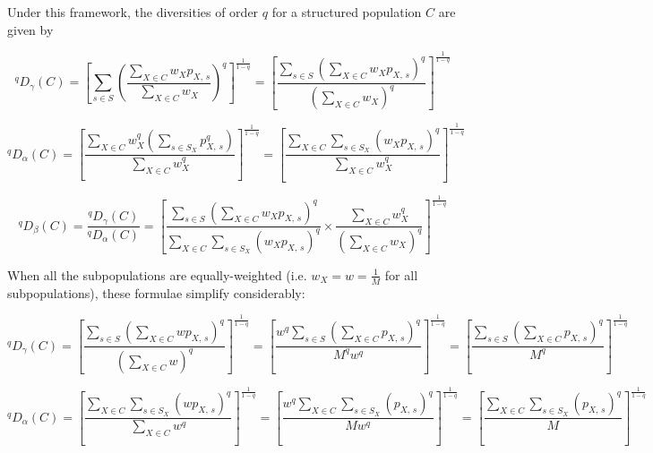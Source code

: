 Under this framework, the diversities of order $q$ for a structured population $C$ are given \parencite{jost2007partitioning} by

\begin{equation}
^qD_\gamma(C)
= \left[\sum_{s \in S} \left(\frac{\displaystyle\sum_{X \in C} w_Xp_{X,\,s}}{\displaystyle\sum_{X \in C} w_X}\right)^q\right]^\frac{1}{1-q}
= \left[\frac{\displaystyle\sum_{s \in S}\left(\sum_{X \in C} w_Xp_{X,\,s}\right)^q}{\displaystyle\left(\sum_{X \in C} w_X\right)^q}\right]^\frac{1}{1-q}
\label{eq:diversity_gamma}
\end{equation}

\begin{equation}
^qD_\alpha(C)
= \left[\frac{\displaystyle\sum_{X \in C} w_X^q \left(\sum_{s \in S_X} p_{X,\,s}^q\right)}{\displaystyle\sum_{X \in C} w_X^q}\right]^\frac{1}{1-q}
= \left[\frac{\displaystyle\sum_{X \in C}\sum_{s \in S_X} (w_Xp_{X,\,s})^q}{\displaystyle\sum_{X \in C} w_X^q}\right]^\frac{1}{1-q}
\label{eq:diversity_alpha}
\end{equation}

\begin{equation}
^qD_\beta(C) = \frac{^qD_\gamma(C)}{^qD_\alpha(C)}
= \left[
\frac{\displaystyle\sum_{s \in S}\left(\sum_{X \in C} w_Xp_{X,\,s}\right)^q}
{\displaystyle\sum_{X \in C}\sum_{s \in S_X} (w_Xp_{X,\,s})^q}
\times
\frac{\displaystyle\sum_{X \in C} w_X^q}
{\displaystyle\left(\sum_{X \in C} w_X\right)^q}
\right]^\frac{1}{1-q}
\label{eq:diversity_beta}
\end{equation}

\noindent When all the subpopulations are equally-weighted (i.e. $w_X = w = \frac{1}{M}$ for all subpopulations), these formulae simplify considerably:

\begin{equation}
^qD_\gamma(C)
= \left[\frac{\displaystyle\sum_{s \in S}\left(\sum_{X \in C} wp_{X,\,s}\right)^q}{\displaystyle\left(\sum_{X \in C} w\right)^q}\right]^\frac{1}{1-q}
= \left[\frac{\displaystyle w^q\sum_{s \in S}\left(\sum_{X \in C} p_{X,\,s}\right)^q}{\displaystyle M^qw^q}\right]^\frac{1}{1-q}
= \left[\frac{\displaystyle\sum_{s \in S}\left(\sum_{X \in C} p_{X,\,s}\right)^q}{\displaystyle M^q}\right]^\frac{1}{1-q}
\label{eq:diversity_gamma_even}
\end{equation}

\begin{equation}
^qD_\alpha(C)
= \left[\frac{\displaystyle\sum_{X \in C}\sum_{s \in S_X} (wp_{X,\,s})^q}{\displaystyle\sum_{X \in C} w^q}\right]^\frac{1}{1-q}
= \left[\frac{\displaystyle w^q\sum_{X \in C}\sum_{s \in S_X} (p_{X,\,s})^q}{\displaystyle M w^q}\right]^\frac{1}{1-q}
= \left[\frac{\displaystyle \sum_{X \in C}\sum_{s \in S_X} (p_{X,\,s})^q}{\displaystyle M}\right]^\frac{1}{1-q}
\label{eq:diversity_alpha_even}
\end{equation}

